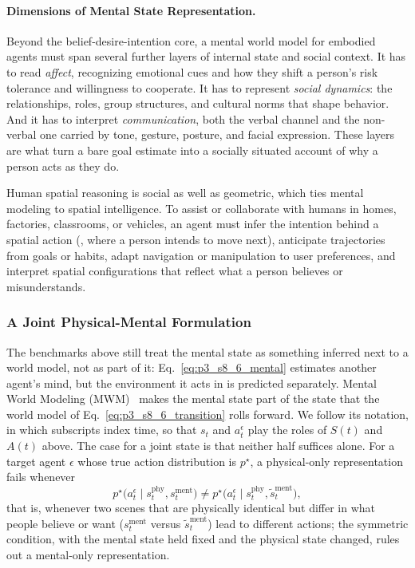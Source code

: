 \paragraph{Dimensions of Mental State Representation.}
Beyond the belief-desire-intention core, a mental world model for embodied agents must span several further layers of internal state and social context. 
It has to read \emph{affect}, recognizing emotional cues and how they shift a person's risk tolerance and willingness to cooperate. 
It has to represent \emph{social dynamics}: the relationships, roles, group structures, and cultural norms that shape behavior. 
And it has to interpret \emph{communication}, both the verbal channel and the non-verbal one carried by tone, gesture, posture, and facial expression. 
These layers are what turn a bare goal estimate into a socially situated account of why a person acts as they do.



Human spatial reasoning is social as well as geometric, which ties mental modeling to spatial intelligence.
To assist or collaborate with humans in homes, factories, classrooms, or vehicles, an agent must infer the intention behind a spatial action (\eg, where a person intends to move next), anticipate trajectories from goals or habits, adapt navigation or manipulation to user preferences, and interpret spatial configurations that reflect what a person believes or misunderstands.


\subsubsection{A Joint Physical-Mental Formulation}
\label{subsubsec:p3_s8_6_mwm}
The benchmarks above still treat the mental state as something inferred next to a world model, not as part of it: Eq.~\eqref{eq:p3_s8_6_mental} estimates another agent's mind, but the environment it acts in is predicted separately. 
Mental World Modeling (MWM)~\cite{fei2026mental} makes the mental state part of the state that the world model of Eq.~\eqref{eq:p3_s8_6_transition} rolls forward. 
We follow its notation, in which subscripts index time, so that $s_t$ and $a_t^{\epsilon}$ play the roles of $S(t)$ and $A(t)$ above.
The case for a joint state is that neither half suffices alone. For a target agent $\epsilon$ whose true action distribution is $p^{\star}$, a physical-only representation fails whenever
\begin{equation}
\label{eq:p3_s8_6_mwm_property}
p^{\star}\big(a_t^{\epsilon} \mid s_t^{\mathrm{phy}}, s_t^{\mathrm{ment}}\big) \neq p^{\star}\big(a_t^{\epsilon} \mid s_t^{\mathrm{phy}}, \tilde{s}_t^{\mathrm{ment}}\big),
\end{equation}
that is, whenever two scenes that are physically identical but differ in what people believe or want ($s_t^{\mathrm{ment}}$ versus $\tilde{s}_t^{\mathrm{ment}}$) lead to different actions; the symmetric condition, with the mental state held fixed and the physical state changed, rules out a mental-only representation.

